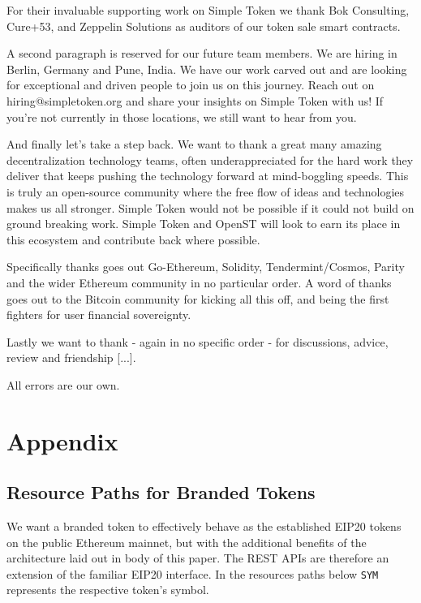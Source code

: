 \documentclass[12pt,a4paper, twocolumn]{article}
\begin{document}
For their invaluable supporting work on Simple Token we thank Bok Consulting, Cure+53, and Zeppelin Solutions as auditors of our token sale smart contracts.\par

A second paragraph is reserved for our future team members.  We are hiring in Berlin, Germany and Pune, India.  We have our work carved out and are looking for exceptional and driven people to join us on this journey.  Reach out on hiring@simpletoken.org and share your insights on Simple Token with us!  If you’re not currently in those locations, we still want to hear from you. \par

And finally let’s take a step back.  We want to thank a great many amazing decentralization technology teams, often underappreciated for the hard work they deliver that keeps pushing the technology forward at mind-boggling speeds.  This is truly an open-source community where the free flow of ideas and technologies makes us all stronger.  Simple Token would not be possible if it could not build on ground breaking work.  Simple Token and OpenST will look to earn its place in this ecosystem and contribute back where possible. \par

Specifically thanks goes out Go-Ethereum, Solidity, Tendermint/Cosmos, Parity and the wider Ethereum community in no particular order.  A word of thanks goes out to the Bitcoin community for kicking all this off, and being the first fighters for user financial sovereignty. \par

Lastly we want to thank - again in no specific order - for discussions, advice, review and friendship [...].\par

All errors are our own.\par

\section{Appendix}
\subsection{Resource Paths for Branded Tokens}
We want a branded token to effectively behave as the established EIP20 tokens on the public Ethereum mainnet, but with the additional benefits of the architecture laid out in body of this paper. The REST APIs are therefore an extension of the familiar EIP20 interface. In the resources paths below \texttt{SYM} represents the respective token’s symbol. \par
\end{document}
